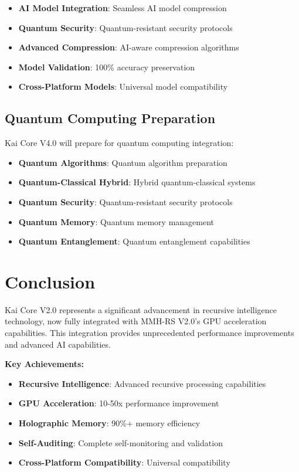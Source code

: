 \documentclass[12pt,a4paper]{article}
\begin{document}
\begin{itemize}
    \item \textbf{AI Model Integration}: Seamless AI model compression
    \item \textbf{Quantum Security}: Quantum-resistant security protocols
    \item \textbf{Advanced Compression}: AI-aware compression algorithms
    \item \textbf{Model Validation}: 100\% accuracy preservation
    \item \textbf{Cross-Platform Models}: Universal model compatibility
\end{itemize}

\subsection{Quantum Computing Preparation}
Kai Core V4.0 will prepare for quantum computing integration:

\begin{itemize}
    \item \textbf{Quantum Algorithms}: Quantum algorithm preparation
    \item \textbf{Quantum-Classical Hybrid}: Hybrid quantum-classical systems
    \item \textbf{Quantum Security}: Quantum-resistant security protocols
    \item \textbf{Quantum Memory}: Quantum memory management
    \item \textbf{Quantum Entanglement}: Quantum entanglement capabilities
\end{itemize}

\newpage

\section{Conclusion}

Kai Core V2.0 represents a significant advancement in recursive intelligence technology, now fully integrated with MMH-RS V2.0's GPU acceleration capabilities. This integration provides unprecedented performance improvements and advanced AI capabilities.

\textbf{Key Achievements:}
\begin{itemize}
    \item \textbf{Recursive Intelligence}: Advanced recursive processing capabilities
    \item \textbf{GPU Acceleration}: 10-50x performance improvement
    \item \textbf{Holographic Memory}: 90\%+ memory efficiency
    \item \textbf{Self-Auditing}: Complete self-monitoring and validation
    \item \textbf{Cross-Platform Compatibility}: Universal compatibility
\end{itemize}
\end{document}
